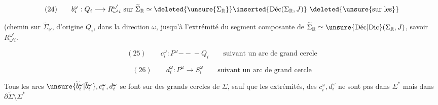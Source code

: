 \[
(24)\qquad b_i^\omega:Q_i\longrightarrow R_{\omega'i}^{\omega'}\text{ sur }\widetilde\Sigma_{\mathbb R}\simeq\deleted{\unsure{\Sigma_{\mathbb R}}}\inserted{\operatorname{\text{Déc}}(\Sigma_{\mathbb R},J)}\ \deleted{\unsure{\text{sur les}}}
\]

(chemin sur $\widetilde\Sigma_{\mathbb R}$, d'origine $Q_i$, dans la direction $\omega$, jusqu'à l'extrémité  du segment composante de $\widetilde\Sigma_{\mathbb R}\simeq\operatorname{\text{\unsure{Déc|Dic}}}(\Sigma_{\mathbb R},J)$, savoir $R_{\omega'i}^{\omega'}$.

\[
(25)\qquad c_i^\omega:P^\omega\mathrel{-\!\!\!-\!\!\!-}Q_i\qquad\text{suivant un arc de grand cercle}
\]

\[
(26)\qquad d_i^\omega:P^\omega\longrightarrow S_i^\omega\qquad\text{suivant un arc de grand cercle}
\]


Tous les arcs $\unsure{\widetilde b_i^\omega|\bar b_i^\omega},c_i^\omega,d_i^\omega$ se font sur des grands cercles de $\Sigma$, sauf que les extrémités, des $c_i^\omega,d_i^\omega$ ne sont pas dans $\Sigma^*$ mais dans  $\partial\widetilde\Sigma\setminus\Sigma^*$

